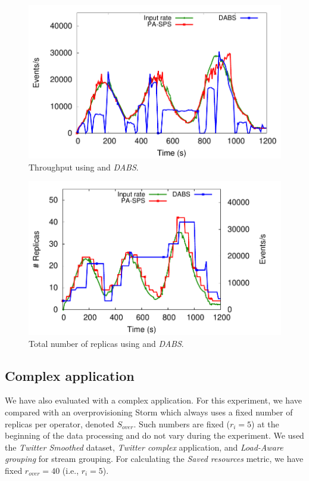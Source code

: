 \begin{figure}[!ht]
    \centering
    \includegraphics[width=0.75\linewidth]{figures/exp/predictive/TwitterLinear-RW-Throughput.pdf}
    \caption{Throughput using \textit{\pSPS{}} and \textit{DABS}.}
    \label{fig:exp-pa-dabs-throughput}
\end{figure}


\begin{figure}[!ht]
    \centering
    \includegraphics[width=0.75\linewidth]{figures/exp/predictive/TwitterLinear-RW-Replicas.pdf}
    \caption{Total number of replicas using \textit{\pSPS{}} and \textit{DABS}.}
    \label{fig:exp-pa-dabs-replicas}
\end{figure}

\subsection{Complex application}
\label{exp:pa-complex}
We have also evaluated \pSPS{} with a complex application. For this experiment, we have compared \pSPS{} with an overprovisioning Storm which always uses a fixed number of replicas per operator, denoted $S_{over}$. Such numbers are fixed ($r_i=5$) at the beginning of the data processing and do not vary during the experiment. We used the \textit{Twitter Smoothed} dataset, \textit{Twitter complex} application, and \textit{Load-Aware grouping} for stream grouping. For calculating the \textit{Saved resources} metric, we have fixed $r_{over} = 40$ (i.e., $r_i = 5$).

